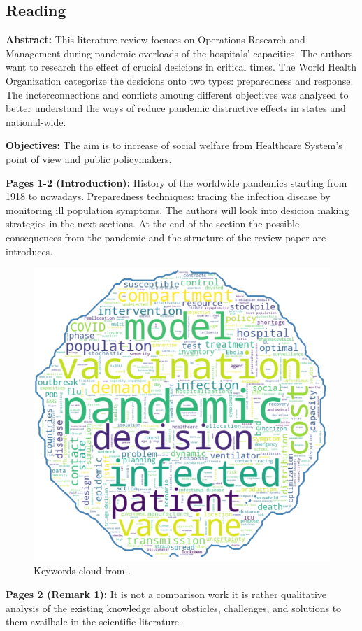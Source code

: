 \subsection{Reading}
    \textbf{Abstract:}
    This literature review focuses on Operations Research and Management during pandemic overloads of the hospitals' capacities. The authors want to research the effect of crucial desicions in critical times. The World Health Organization categorize the desicions onto two types: preparedness and response. The incterconnections and conflicts amoung different objectives was analysed to better understand the ways of reduce pandemic distructive effects in states and national-wide. 
    
    \textbf{Objectives:}
    The aim is to increase of social welfare from Healthcare System's point of view and public policymakers. 

    
    \textbf{Pages 1-2 (Introduction):}
    History of the worldwide pandemics starting from 1918 to nowadays. Preparedness techniques: tracing the infection disease by monitoring ill population symptoms. The authors will look into desicion making strategies in the next sections. At the end of the section the possible consequences from the pandemic and the structure of the review paper are introduces. 
    \begin{figure}[H]
        \centering
        \includegraphics[width=.6\textwidth]{figures/SR0018CA23/fig1.png}
        \caption{Keywords cloud from \cite{x128}.}
        \label{fig1:SR0018CA23}
    \end{figure}
    
    \textbf{Pages 2 (Remark 1):}
    It is not a comparison work it is rather qualitative analysis of the existing knowledge about obsticles, challenges, and solutions to them availbale in the scientific literature.
    
